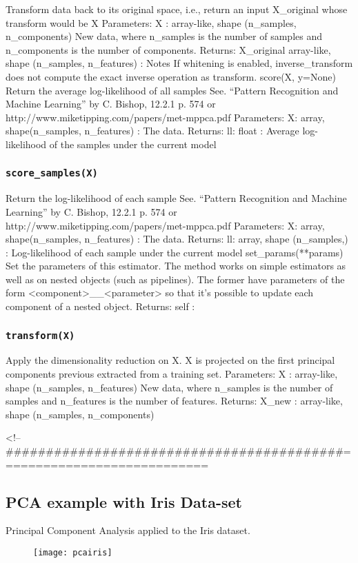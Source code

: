 Transform data back to its original space, i.e., return an input X_original whose transform would be X
Parameters:	
X : array-like, shape (n_samples, n_components)
New data, where n_samples is the number of samples and n_components is the number of components.
Returns:	
X_original array-like, shape (n_samples, n_features) :
Notes
If whitening is enabled, inverse_transform does not compute the exact inverse operation as transform.
score(X, y=None)
Return the average log-likelihood of all samples
See. “Pattern Recognition and Machine Learning” by C. Bishop, 12.2.1 p. 574 or http://www.miketipping.com/papers/met-mppca.pdf
Parameters:	
X: array, shape(n_samples, n_features) :
The data.
Returns:	
ll: float :
Average log-likelihood of the samples under the current model
\subsubsection*{\texttt{score_samples(X)}}
Return the log-likelihood of each sample
See. “Pattern Recognition and Machine Learning” by C. Bishop, 12.2.1 p. 574 or http://www.miketipping.com/papers/met-mppca.pdf
Parameters:	
X: array, shape(n_samples, n_features) :
The data.
Returns:	
ll: array, shape (n_samples,) :
Log-likelihood of each sample under the current model
set_params(**params)
Set the parameters of this estimator.
The method works on simple estimators as well as on nested objects (such as pipelines). The former have parameters of the form <component>__<parameter> so that it’s possible to update each component of a nested object.
Returns:	self :
\subsubsection*{\texttt{transform(X)}}
Apply the dimensionality reduction on X.
X is projected on the first principal components previous extracted from a training set.
Parameters:	
X : array-like, shape (n_samples, n_features)
New data, where n_samples is the number of samples and n_features is the number of features.
Returns:	
X_new : array-like, shape (n_samples, n_components)

<!-- ##########################################============================ %
\newpage

\subsection*{PCA example with Iris Data-set}
Principal Component Analysis applied to the Iris dataset.
\begin{figure}
	\centering
	\texttt{[image: pcairis]}
	\caption{}
	\label{fig:pcairis}
\end{figure}

